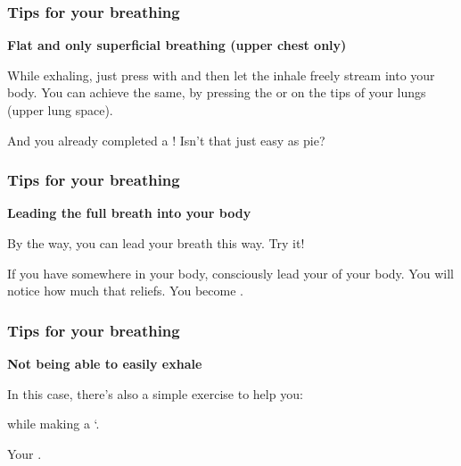 \begin{frame}
  \frametitle{Tips for your breathing}

  \textbf{Flat and only superficial breathing (upper chest only)}

    \vspace{5 mm}

    While exhaling, just press with  and then let the inhale freely stream into your body.
    You can achieve the same, by pressing the  or on the tips of your lungs (upper lung space).
    
    And you already completed a ! Isn't that just easy as pie?

    \end{frame}

\begin{frame}
  \frametitle{Tips for your breathing}

  \textbf{Leading the full breath into your body}

  \vspace{5 mm}

    By the way, you can lead your breath  this way. Try it!
    
    If you have  somewhere in your body, consciously lead your  of your body.
    You will notice how much that reliefs.
    You become .
  
\end{frame}


\begin{frame}
  \frametitle{Tips for your breathing}

  \textbf{Not being able to easily exhale}

    \vspace{5 mm}

  In this case, there's also a simple exercise to help you:
  
   while making a `.

    \vspace{5 mm}
  
  Your .

  \end{frame}

